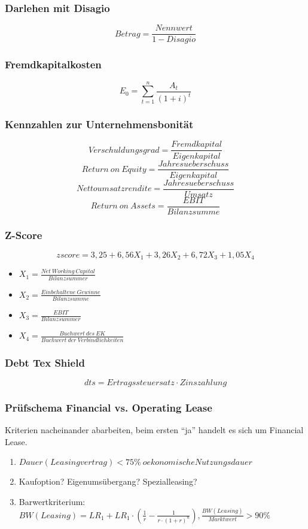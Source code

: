 \subsubsection{Darlehen mit Disagio}
\[Betrag = \frac{Nennwert}{1 - Disagio}\]

\subsubsection{Fremdkapitalkosten}
\[E_0 = \sum_{t=1}^{n} \frac{A_t}{(1+i)^t}\]

\subsubsection{Kennzahlen zur Unternehmensbonität}
\[Verschuldungsgrad = \frac{Fremdkapital}{Eigenkapital}\]
\[Return~on~Equity = \frac{Jahresueberschuss}{Eigenkapital}\]
\[Nettoumsatzrendite = \frac{Jahresueberschuss}{Umsatz}\]
\[Return~on~Assets = \frac{EBIT}{Bilanzsumme}\]

\subsubsection{Z-Score}
\[zscore = 3,25 + 6,56X_1 + 3,26X_2 + 6,72X_3 + 1,05X_4\]
\begin{itemize}
	\item \(X_1 = \frac{Net~Working~Capital}{Bilanzsummer}\)
	\item \(X_2 = \frac{Einbehaltene~Gewinne}{Bilanzsumme}\)
	\item \(X_3 = \frac{EBIT}{Bilanzsummer}\)
	\item \(X_4 = \frac{Buchwert~des~EK}{Buchwert~der~Verbindlichkeiten}\)
\end{itemize}

\subsubsection{Debt Tex Shield}
\[dts = Ertragssteuersatz \cdot Zinszahlung\]

\subsubsection{Prüfschema Financial vs. Operating Lease}
Kriterien nacheinander abarbeiten, beim ersten "`ja"' handelt es sich um Financial Lease.
\begin{enumerate}
	\item \(Dauer(Leasingvertrag) < 75\%~oekonomische Nutzungsdauer\)
	\item Kaufoption? Eigenumsübergang? Spezialleasing?
	\item Barwertkriterium: \(BW(Leasing) = LR_1 + LR_1 \cdot (\frac{1}{r} - \frac{1}{r \cdot (1+r)^n}), \frac{BW(Leasing)}{Marktwert} > 90\%\) 
\end{enumerate}



